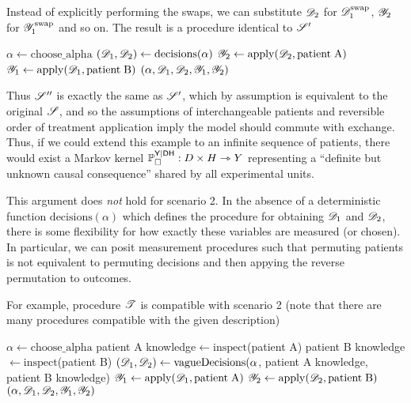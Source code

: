 Instead of explicitly performing the swaps, we can substitute $\mathscr{D}_2$ for $\mathscr{D}_1^{\text{swap}}$, $\mathscr{Y}_2$ for $\mathscr{Y}_1^{\text{swap}}$ and so on. The result is a procedure identical to $\mathscr{S}'$

\begin{algorithmic}
    \State $\alpha \gets \mathrm{choose\_alpha}$
    \State $(\mathscr{D}_1,\mathscr{D}_2) \gets \mathrm{decisions}(\alpha)$
    \State $\mathscr{Y}_2\gets \mathrm{apply}(\mathscr{D}_2,\mathrm{patient\;A})$
    \State $\mathscr{Y}_1\gets \mathrm{apply}(\mathscr{D}_1,\mathrm{patient\;B})$
    \State \Return $(\alpha,\mathscr{D}_1,\mathscr{D}_2,\mathscr{Y}_1,\mathscr{Y}_2)$
    \EndProcedure
\end{algorithmic}

Thus $\mathscr{S}''$ is exactly the same as $\mathscr{S}'$, which by assumption is equivalent to the original $\mathscr{S}$, and so the assumptions of interchangeable patients and reversible order of treatment application imply the model should commute with exchange. Thus, if we could extend this example to an infinite sequence of patients, there would exist a Markov kernel $\mathbb{P}_\square^{\mathsf{Y}|\mathsf{DH}}:D\times H\rightarrowtriangle Y$ representing a ``definite but unknown causal consequence'' shared by all experimental units.

This argument does \emph{not} hold for scenario 2. In the absence of a deterministic function $\text{decisions}(\alpha)$ which defines the procedure for obtaining $\mathscr{D}_1$ and $\mathscr{D}_2$, there is some flexibility for how exactly these variables are measured (or chosen). In particular, we can posit measurement procedures such that permuting patients is not equivalent to permuting decisions and then appying the reverse permutation to outcomes.

For example, procedure $\mathscr{T}$ is compatible with scenario 2 (note that there are many procedures compatible with the given description)

\begin{algorithmic}
    \State $\alpha \gets \mathrm{choose\_alpha}$
    \State patient A knowledge$\gets \mathrm{inspect}$(patient A)
    \State patient B knowledge$\gets \mathrm{inspect}$(patient B)
    \State $(\mathscr{D}_1,\mathscr{D}_2) \gets \mathrm{vagueDecisions}(\alpha$, patient A knowledge, patient B knowledge)
    \State $\mathscr{Y}_1\gets \mathrm{apply}(\mathscr{D}_1,\mathrm{patient\;A})$
    \State $\mathscr{Y}_2\gets \mathrm{apply}(\mathscr{D}_2,\mathrm{patient\;B})$
    \State \Return $(\alpha,\mathscr{D}_1,\mathscr{D}_2,\mathscr{Y}_1,\mathscr{Y}_2)$
    \EndProcedure
\end{algorithmic}

